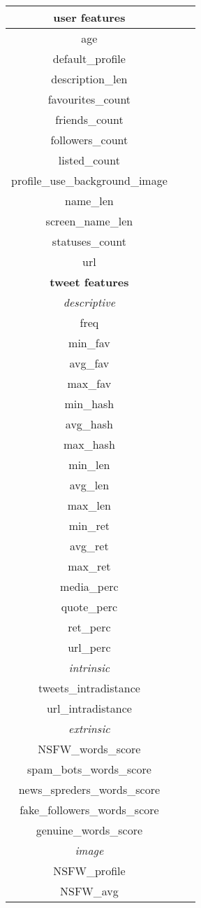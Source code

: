 \begin{center}
	\begin{tabular}{ccc}
		\hline\hline
		\textbf{user features}\\
		\hline\hline
		age\\
		default\_profile\\
		description\_len\\
		favourites\_count\\
		friends\_count\\
		followers\_count\\
		listed\_count\\
		profile\_use\_background\_image\\
		name\_len\\
		screen\_name\_len\\
		statuses\_count\\
		url\\
		\hline\hline
		\textbf{tweet  features}\\
		\hline\hline
		\textit{descriptive}\\
		\hline
		freq\\
		min\_fav\\
		avg\_fav\\
		max\_fav\\
		min\_hash\\
		avg\_hash\\
		max\_hash\\
		min\_len\\
		avg\_len\\
		max\_len\\
		min\_ret\\
		avg\_ret\\
		max\_ret\\
		media\_perc\\
		quote\_perc\\
		ret\_perc\\
		url\_perc\\
		\hline
		\textit{intrinsic}\\
		\hline
		tweets\_intradistance\\
		url\_intradistance\\
		\hline
		\textit{extrinsic}\\
		\hline
		NSFW\_words\_score\\
		spam\_bots\_words\_score\\
		news\_spreders\_words\_score\\
		fake\_followers\_words\_score\\
		genuine\_words\_score\\
		\hline
		\textit{image}\\
		\hline
		NSFW\_profile\\
		NSFW\_avg\\\hline
	\end{tabular}
\end{center}
\normalsize


